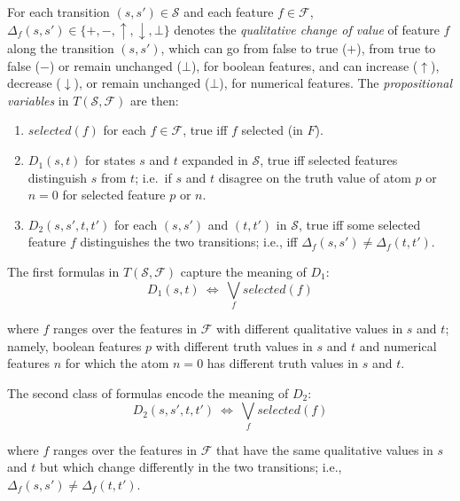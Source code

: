 \documentclass[letterpaper]{article} %
\newcommand{\F}{\mathcal{F}}
\renewcommand{\S}{\mathcal{S}}
\begin{document}
For each transition  $(s, s') \in \S$ and each  feature $f \in \F$,
$\Delta_f(s, s') \in \{+, -, \uparrow, \downarrow, \bot\}$  denotes the
\emph{qualitative change of value} of feature $f$ along the transition $(s, s')$,
which can go from false to true ($+$), from true to false ($-$) or remain
unchanged ($\bot$), for boolean features, and can increase ($\uparrow$),
decrease ($\downarrow$), or remain unchanged ($\bot$), for numerical features.
The \emph{propositional variables} in $T(\S,\F)$ are then:
\begin{enumerate}[{\small$\bullet$}]
  \item $selected(f)$ for each $f \in \F$, true iff $f$ selected (in $F$).
  \item $D_1(s,t)$ for states $s$ and $t$ expanded in $\S$,  true iff
    selected features distinguish $s$ from $t$; i.e.\ if $s$ and $t$ disagree
    on  the truth value of atom  $p$ or  $n=0$ for   selected  feature $p$ or $n$.
  \item $D_2(s, s', t, t')$ for each $(s, s')$ and $(t, t')$ in $\S$,
    true iff some selected feature $f$ distinguishes the two transitions; i.e., iff
    $\Delta_f(s, s')\not=\Delta_f(t,t')$. 
\end{enumerate}

\medskip
\noindent The first formulas in $T(\S,\F)$ capture the meaning of $D_1$:
%  
\begin{equation}
  \label{eq:d1}
  D_1(s, t) \ \Leftrightarrow\ \textstyle \bigvee_{f}  selected(f)
\end{equation}

\noindent where $f$ ranges over the features in $\F$ with  different qualitative
values in $s$ and $t$; namely, boolean features $p$ with different
truth values in $s$ and $t$ and numerical features $n$ for which 
the atom $n=0$ has different truth values in $s$ and $t$. 

The second class of formulas encode the meaning of $D_2$:
%
\begin{equation}
  \label{eq:d2}
  D_2(s, s', t, t') \ \Leftrightarrow\ \textstyle\bigvee_f  selected(f)
\end{equation}

\noindent where $f$ ranges over the features in $\F$ that have the same
qualitative values in $s$ and $t$ but which change differently in the two
transitions; i.e., $\Delta_f(s, s') \neq \Delta_f(t, t')$.
\end{document}
